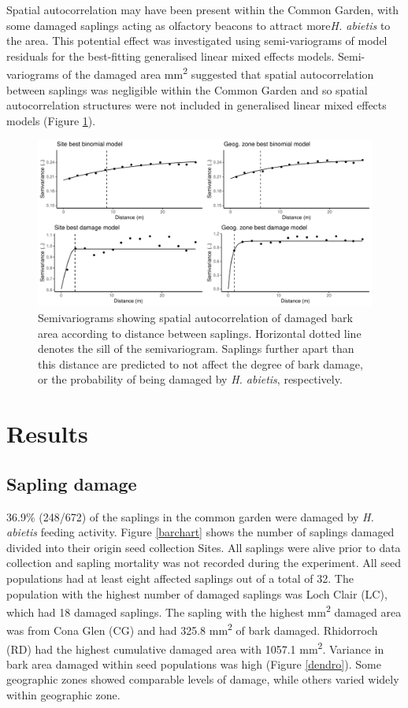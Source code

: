 \documentclass[a4paper, 11pt]{article}
\begin{document}
Spatial autocorrelation may have been present within the Common Garden, with some damaged saplings acting as olfactory beacons to attract more\textit{H. abietis} to the area. This potential effect was investigated using semi-variograms of model residuals for the best-fitting generalised linear mixed effects models. Semi-variograms of the damaged area mm\textsuperscript{2} suggested that spatial autocorrelation between saplings was negligible within the Common Garden and so spatial autocorrelation structures were not included in generalised linear mixed effects models (Figure \ref{semivariogram_all}).

\begin{figure}[H]
	\includegraphics[width=\textwidth]{semivariogram_all}
	\caption{Semivariograms showing spatial autocorrelation of damaged bark area according to distance between saplings. Horizontal dotted line denotes the sill of the semivariogram. Saplings further apart than this distance are predicted to not affect the degree of bark damage, or the probability of being damaged by \textit{H. abietis}, respectively.}
	\label{semivariogram_all}
\end{figure}

\section*{Results}

\subsection*{Sapling damage}

36.9\% (248/672) of the saplings in the common garden were damaged by \textit{H. abietis} feeding activity. Figure \ref{barchart} shows the number of saplings damaged divided into their origin seed collection Sites. All saplings were alive prior to data collection and sapling mortality was not recorded during the experiment. All seed populations had at least eight affected saplings out of a total of 32. The population with the highest number of damaged saplings was Loch Clair (LC), which had 18 damaged saplings. The sapling with the highest mm\textsuperscript{2} damaged area was from Cona Glen (CG) and had 325.8 mm\textsuperscript{2} of bark damaged. Rhidorroch (RD) had the highest cumulative damaged area with 1057.1 mm\textsuperscript{2}. Variance in bark area damaged within seed populations was high (Figure \ref{dendro}). Some geographic zones showed comparable levels of damage, while others varied widely within geographic zone.
\end{document}
